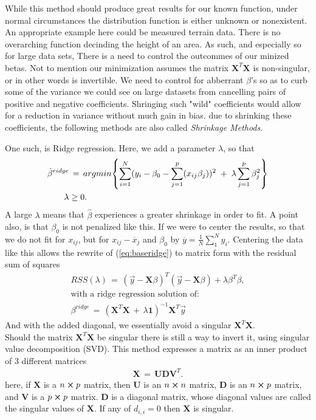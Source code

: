\documentclass[ 12pt, a4paper ]{article}
\begin{document}
While this method should produce great results for our known function, under normal 
circumstances the distribution function is either unknown or nonexistent. An appropriate 
example here could be measured terrain data. There is no overarching function decinding the 
height of an area. As such, and especially so for large data sets, There is a need to control 
the outcommes of our minized betas. Not to mention our minimization assumes the matrix
$\mathbf{X}^T\mathbf{X}$ is non-singular, or in other words is invertible. We need to control
for abberrant $\beta$'s so as to curb some of the variance we could see on large datasets from 
cancelling pairs of positive and negative coefficients. 
Shringing such "wild" coefficients would allow for a reduction in variance without much gain
in bias. due to shrinking these coefficients, the following methods are also called 
\textit{Shrinkage Methods}. 

One such, is Ridge regression. Here, we add a parameter $\lambda$, so that 
\begin{align}
    \hat{\beta}^{ridge} &\,=\, 
    argmin\qty{ \sum_{i=1}^N (y_i - \beta_0 - \sum_{j=1}^p(x_{ij}\beta_j) )^2 
        \;+\; \lambda \sum_{j=1}^p \beta_j^2 }\label{eq:baseridge} \\
    \lambda &\geq 0. \nonumber
\end{align}
A large $\lambda$ means that $\hat{\beta}$ experiences a greater shrinkage in order to fit.
A point also, is that $\beta_0$ is not penalized like this. If we were to center the results, 
so that we do not fit for $x_{ij}$, but for $x_{ij} - \overline{x}_j$ and $\beta_0$ by 
$ \overline{y} = \frac{1}{N} \sum_1^N y_i$. %
Centering the data like this allows the rewrite of (\ref{eq:baseridge}) to matrix form
with the residual sum of squares
\begin{align}
    RSS(\lambda) \,=\, (\vec{y} - \mathbf{X}\beta)^T (\vec{y} - \mathbf{X}\beta)
        +   \lambda \beta^T\beta, \\
    \text{with a ridge regression solution of:}\nonumber \\
    \beta^{ridge} \,=\, (\mathbf{X}^T\mathbf{X} \,+\, \lambda \mathbf{1})^{-1}\mathbf{X}^T\vec{y}
    \label{eq:ridgesol}
\end{align}
And with the added diagonal, we essentially avoid a singular $\mathbf{X}^T\mathbf{X}$.\\

Should the matrix $\mathbf{X}^T \mathbf{X}$ be singular there is still a way to invert it, 
using singular value decomposition (SVD). This method expresses a matrix as an inner product 
of 3 different matrices\cite{}%
\begin{align}
    \mathbf{X} \,=\, \mathbf{U}\mathbf{D}\mathbf{V}^T.\label{eq:svdX}
\end{align}
here, if $\mathbf{X}$ is a $n\cross p$ matrix, then $\mathbf{U}$ is an $n \cross n$ matrix, 
$\mathbf{D}$ is an $n\cross p$ matrix, and $\mathbf{V}$ is a $p\cross p$ matrix. $\mathbf{D}$
is a diagonal matrix, whose diagonal values are called the singular values of $\mathbf{X}$.
If any of $d_{i,i}=0$ then $\mathbf{X}$ is singular. 
\end{document}
